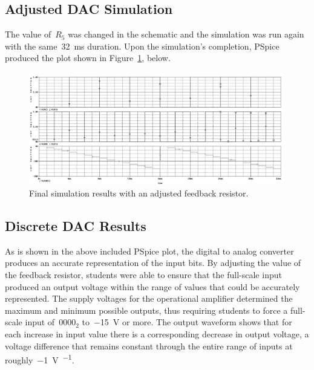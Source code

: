 \subsection{Adjusted DAC Simulation}
The value of~$R_5$ was changed in the schematic and the simulation was run
again with the same~\SI{32}{\milli\second} duration.  Upon the simulation's
completion, PSpice produced the plot shown in Figure~\ref{f:dac_plot2}, below.
%
\begin{figure}[H]
\centering
	\includegraphics[width=.8\textwidth]{img/plot/part1_plot2b.PNG}
	\parbox{.8\textwidth}{
	\caption[Discrete DAC --- Tuned Results]{Final simulation results with an
	adjusted feedback resistor.}
	\label{f:dac_plot2}}
\end{figure}

\subsection{Discrete DAC Results}
As is shown in the above included PSpice plot, the digital to analog converter
produces an accurate representation of the input bits.  By adjusting the value
of the feedback resistor, students were able to ensure that the full-scale
input produced an output voltage within the range of values that could be
accurately represented.  The supply voltages for the operational amplifier
determined the maximum and minimum possible outputs, thus requiring students to
force a full-scale input of~$0000_2$ to~\SI{-15}{\volt} or more.  The output
waveform shows that for each increase in input value there is a corresponding
decrease in output voltage, a voltage difference that remains constant through
the entire range of inputs at roughly~\SI{-1}{\volt\per\bit}.
